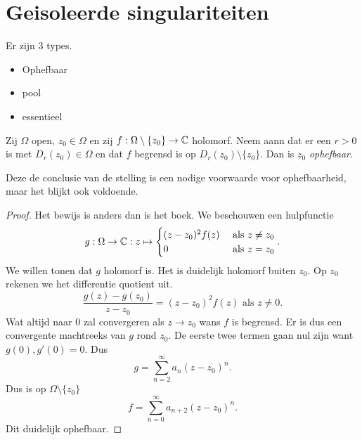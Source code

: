 
\section{Geisoleerde singulariteiten} \label{sec:geisoleerde_singulariteiten}
\begin{herhaling}
	Er zijn 3 types. 
	\begin{itemize}
		\item Ophefbaar
		\item pool
		\item essentieel
	\end{itemize}
\end{herhaling}

\begin{stelling}

	Zij $\Omega $ open, $z_0 \in \Omega$ en zij $f: \Omega \setminus \{ z_0\} \to \mathbb{C}$ holomorf. 
	Neem aann dat er een $r > 0$ is met $D_r(z_0) \in \Omega$ en dat $f$ begrensd is op $D_r(z_0)\setminus \{z_0\} $. 
	Dan is $z_0$ \emph{ophefbaar}.
\end{stelling}
Deze de conclusie van de stelling is een nodige voorwaarde voor ophefbaarheid, maar het blijkt ook voldoende. 
\begin{proof}
	Het bewijs is anders dan is het boek. 
	We beschouwen een hulpfunctie \[
	g: \Omega \to \mathbb{C}: z\mapsto \begin{cases}
		(z - z_0)^2f(z) & \text{ als } z \ne z_0\\
		0 & \text{ als } z = z_0
	\end{cases}
	.\] 
	We willen tonen dat $g$ holomorf is. Het is duidelijk holomorf buiten $z_0$. Op $z_0$ rekenen we het differentie quotient uit. 
	\[
		\frac{g(z) - g(z_0)}{z - z_0} = (z- z_0)^2f(z) \text{ als } z\ne 0	
	.\] 
	Wat altijd naar 0 zal convergeren als $z \to z_0$ wans $f$ is begrensd. 
	Er is dus een convergente machtreeks van $g$ rond $z_0$. 
	De eerste twee termen gaan nul zijn want $g(0), g'\left(0 \right)  = 0$.
	Dus \[
		g = \sum_{n=2}^{\infty} a_n (z - z_0)^{n}	
	.\] 
	Dus is op $\Omega \setminus \{z_0\} $\[
		f = \sum_{n = 0}^{\infty} a_{n + 2} (z - z_0)^{n}
	.\] 
	Dit duidelijk ophefbaar. 
\end{proof}

